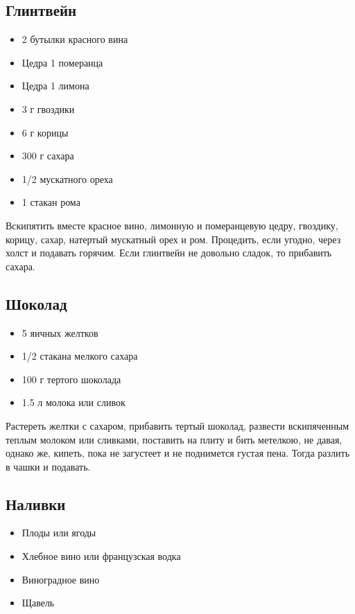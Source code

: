 \subsection{Глинтвейн}

\begin{itemize}
	\item 2 бутылки красного вина 
    \item Цедра 1 померанца
    \item Цедра 1 лимона 
    \item 3 г гвоздики 
    \item 6 г корицы 
    \item 300 г сахара
    \item 1/2 мускатного ореха
    \item 1 стакан рома
\end{itemize}

Вскипятить вместе красное вино, лимонную и померанцевую цедру, гвоздику, корицу, сахар, натертый мускатный орех и ром. Процедить, если угодно, через холст и подавать горячим. Если глинтвейн не довольно сладок, то прибавить сахара.

\subsection{Шоколад}

\begin{itemize}
	\item 5 яичных желтков
    \item 1/2 стакана мелкого сахара 
    \item 100 г тертого шоколада
    \item 1.5 л молока или сливок
\end{itemize}

Растереть желтки с сахаром, прибавить тертый шоколад, развести вскипяченным теплым молоком или сливками, поставить на плиту и бить метелкою, не давая, однако же, кипеть, пока не загустеет и не поднимется густая пена. Тогда разлить в чашки и подавать.

\subsection{Наливки}

\begin{itemize}
	\item Плоды или ягоды 
    \item Хлебное вино или французская водка 
    \item Виноградное вино 
    \item Щавель
\end{itemize}

